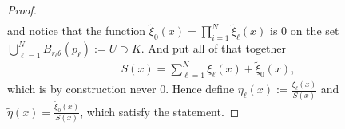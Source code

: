 \begin{proof}
\begin{align*}
    \end{align*}
    and notice that the function $\tilde{\xi}_{0}(x) = \prod_{i=1}^{N} \tilde{\xi}_{\ell}(x)$ is $0$ on the set $\bigcup_{\ell=1}^{N} B_{r_{\ell}\theta}(p_{\ell}) := U \supset K$. And put all of that together 
    \begin{align*}
        S(x) = \sum_{\ell=1}^{N} \xi_{\ell}(x) + \tilde{\xi}_{0}(x), 
    \end{align*}
    which is by construction never $0$. Hence define $\eta_{\ell}(x) := \frac{\xi_{\ell}(x)}{S(x)}$ and $\tilde{\eta}(x) = \frac{\tilde{\xi}_{0}(x)}{S(x)}$, which satisfy the statement. 
\end{proof}


